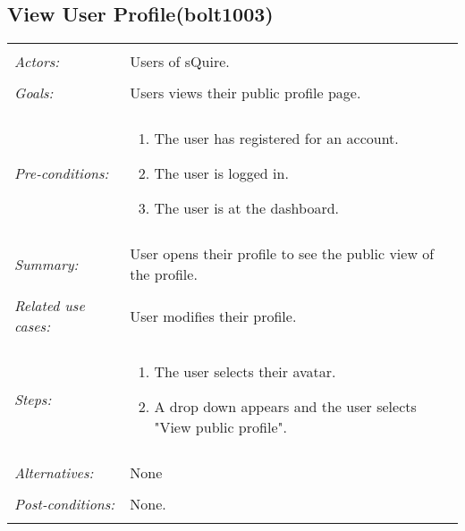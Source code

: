 \documentclass[11pt]{report}
\begin{document}
\subsection{View User Profile(bolt1003)}
\begin{tabular}{ p{2cm} p{12cm} }
 \hline
 \\
 \textit{Actors:} & Users of sQuire. \\ 
 \\
 \textit{Goals:} & Users views their public profile page. \\
 \\
 \textit{Pre-conditions:} & \begin{enumerate}
  \item The user has registered for an account.
  \item The user is logged in.
  \item The user is at the dashboard.
 \end{enumerate} \\
 \\
 \textit{Summary:} & User opens their profile to see the public view of the profile.\\ 
 \\
 \textit{Related use cases:} & User modifies their profile. \\ 
 \\
 \textit{Steps:} & \begin{enumerate}
  \item The user selects their avatar.
  \item A drop down appears and the user selects "View public profile".
 \end{enumerate} \\
 \\
 \textit{Alternatives:} & None \\
 \\
 \textit{Post-conditions:} & None. \\
 \\
\hline
\end{tabular}
\end{document}
